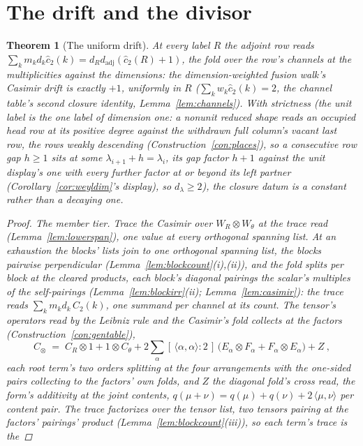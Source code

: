 \documentclass[11pt]{article}
\newtheorem{theorem}{Theorem}
\theoremstyle{definition}
\begin{document}
\section{The drift and the divisor}

\begin{theorem}[The uniform drift]\label{thm:drift}
At every label $R$ the adjoint row reads
$\sum_km_kd_k\hat c_2(k)=d_Rd_{\mathrm{adj}}(\hat c_2(R)+1)$, the
fold over the row's channels at the multiplicities against the
dimensions: \emph{the dimension-weighted fusion walk's Casimir
drift is exactly $+1$, uniformly in $R$}
($\sum_kw_k\hat c_2(k)=2$, the channel table's second closure
identity, Lemma~\ref{lem:channels}). With strictness (the unit
label is the one label of dimension one: a nonunit reduced shape
reads an occupied head row at its positive degree against the
withdrawn full column's vacant last row, the rows weakly
descending (Construction~\ref{con:places}), so a consecutive row
gap $h\ge1$ sits at some $\lambda_{i+1}+h=\lambda_i$, its gap
factor $h+1$ against the unit display's one with every further
factor at or beyond its left partner
(Corollary~\ref{cor:weyldim}'s display), so $d_\lambda\ge2$), the
closure datum is a \emph{constant} rather than a decaying one.
\begin{proof}
\emph{The member tier.} Trace the Casimir over
$W_R\otimes W_\theta$ at the trace read
(Lemma~\ref{lem:lowerspan}), one value at every orthogonal
spanning list. At an exhaustion the blocks' lists join to one
orthogonal spanning list, the blocks pairwise perpendicular
(Lemma~\ref{lem:blockcount}(i),(ii)), and the fold splits per
block at the cleared products, each block's diagonal pairings the
scalar's multiples of the self-pairings
(Lemma~\ref{lem:blockirr}(ii); Lemma~\ref{lem:casimir}): the
trace reads $\sum_km_kd_k\,C_2(k)$, one summand per channel at
its count. The tensor's operators read by the Leibniz rule and
the Casimir's fold collects at the factors
(Construction~\ref{con:gentable}),
\[
C_\otimes\;=\;C_R\otimes1+1\otimes C_\theta
+2\sum_\alpha[\,\langle\alpha,\alpha\rangle:2\,]\,
\big(E_\alpha\otimes F_\alpha+F_\alpha\otimes E_\alpha\big)
+Z\ ,
\]
each root term's two orders splitting at the four arrangements
with the one-sided pairs collecting to the factors' own folds,
and $Z$ the diagonal fold's cross read, the form's additivity at
the joint contents,
$q(\mu+\nu)=q(\mu)+q(\nu)+2\,\langle\mu,\nu\rangle$ per content
pair. The trace factorizes over the tensor list, two tensors
pairing at the factors' pairings' product
(Lemma~\ref{lem:blockcount}(iii)), so each term's trace is the

\end{proof}
\end{theorem}
\end{document}

